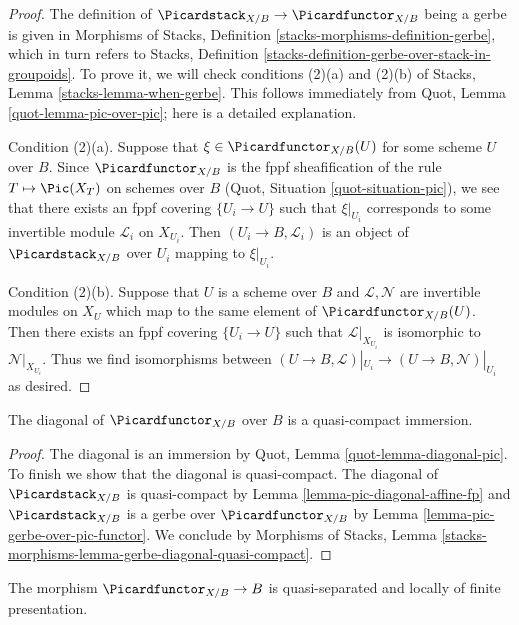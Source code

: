 \begin{proof}
The definition of $\Picardstack_{X/B} \to \Picardfunctor_{X/B}$ being
a gerbe is given in Morphisms of Stacks, Definition
\ref{stacks-morphisms-definition-gerbe}, which in turn refers to
Stacks, Definition \ref{stacks-definition-gerbe-over-stack-in-groupoids}.
To prove it, we will check conditions (2)(a) and (2)(b) of
Stacks, Lemma \ref{stacks-lemma-when-gerbe}. This follows immediately from
Quot, Lemma \ref{quot-lemma-pic-over-pic}; here is a detailed explanation.

\medskip\noindent
Condition (2)(a).
Suppose that $\xi \in \Picardfunctor_{X/B}(U)$ for some scheme $U$ over $B$.
Since $\Picardfunctor_{X/B}$ is the fppf sheafification of the rule
$T \mapsto \Pic(X_T)$ on schemes over $B$
(Quot, Situation \ref{quot-situation-pic}), we see that there exists an
fppf covering $\{U_i \to U\}$ such that $\xi|_{U_i}$ corresponds
to some invertible module $\mathcal{L}_i$ on $X_{U_i}$.
Then $(U_i \to B, \mathcal{L}_i)$ is an object of
$\Picardstack_{X/B}$ over $U_i$ mapping to $\xi|_{U_i}$.

\medskip\noindent
Condition (2)(b). Suppose that $U$ is a scheme over $B$ and
$\mathcal{L}, \mathcal{N}$ are invertible modules on $X_U$
which map to the same element of $\Picardfunctor_{X/B}(U)$.
Then there exists an fppf covering $\{U_i \to U\}$
such that $\mathcal{L}|_{X_{U_i}}$ is isomorphic to $\mathcal{N}|_{X_{U_i}}$.
Thus we find isomorphisms between
$(U \to B, \mathcal{L})|_{U_i} \to (U \to B, \mathcal{N})|_{U_i}$
as desired.
\end{proof}

\begin{lemma}
\label{lemma-pic-functor-diagonal-qc-immersion}
The diagonal of $\Picardfunctor_{X/B}$ over $B$ is a quasi-compact immersion.
\end{lemma}

\begin{proof}
The diagonal is an immersion by Quot, Lemma \ref{quot-lemma-diagonal-pic}.
To finish we show that the diagonal is quasi-compact.
The diagonal of $\Picardstack_{X/B}$ is quasi-compact
by Lemma \ref{lemma-pic-diagonal-affine-fp} and
$\Picardstack_{X/B}$ is a gerbe over $\Picardfunctor_{X/B}$ by
Lemma \ref{lemma-pic-gerbe-over-pic-functor}.
We conclude by Morphisms of Stacks, Lemma
\ref{stacks-morphisms-lemma-gerbe-diagonal-quasi-compact}.
\end{proof}

\begin{lemma}
\label{lemma-pic-functor-qs-lfp}
The morphism $\Picardfunctor_{X/B} \to B$ is quasi-separated and
locally of finite presentation.
\end{lemma}

